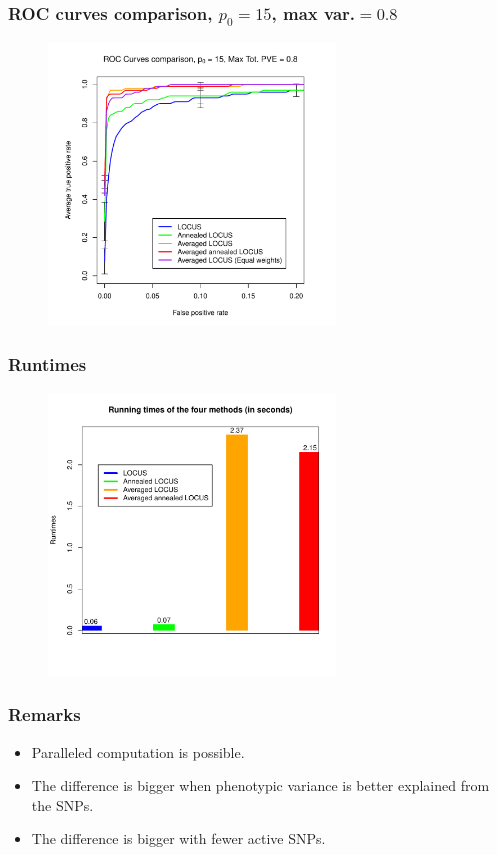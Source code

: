 \documentclass{beamer}
\begin{document}
\begin{frame}
\frametitle{ROC curves comparison, $p_0 = 15$, max var.$=0.8$}
\begin{figure}
\includegraphics[width=3in]{images/ROC_curves.pdf}
\end{figure}
\end{frame}

\begin{frame}
\frametitle{Runtimes}
\begin{figure}
\includegraphics[width=3in]{images/runtimes.pdf}
\end{figure}
\end{frame}

\begin{frame}
\frametitle{Remarks}
\begin{itemize}
\item Paralleled computation is possible.
\item The difference is bigger when phenotypic variance is better explained from the SNPs.
\item The difference is bigger with fewer active SNPs.
\end{itemize}
\end{frame}
\end{document}
